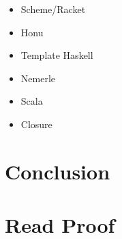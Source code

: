 \documentclass[preprint,10pt]{sigplanconf}
\begin{document}
\begin{itemize}
\item Scheme/Racket
\item Honu
\item Template Haskell
\item Nemerle
\item Scala
\item Closure
\end{itemize}
\section{Conclusion}
\label{sec-8}

\appendix

\clearpage

\section{Read Proof}
\end{document}
